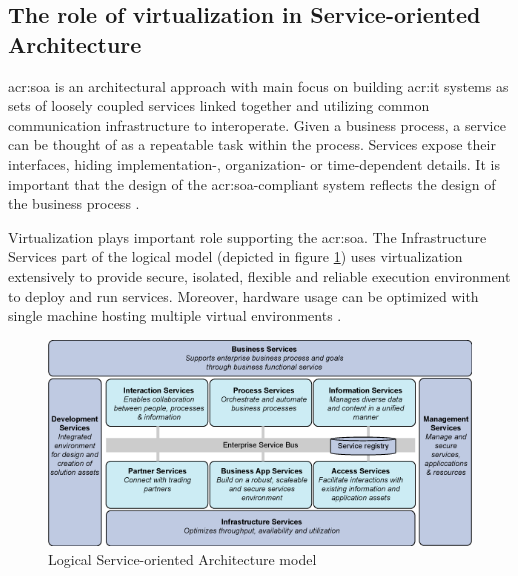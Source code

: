 \documentclass[11pt,openany]{book}
\begin{document}
      \subsection{The role of virtualization in Service-oriented Architecture}

        \gls{acr:soa} is an architectural approach with main focus on building \gls{acr:it} systems as sets of loosely
        coupled services linked together and utilizing common communication infrastructure to interoperate. Given a
        business process, a service can be thought of as a repeatable task within the process. Services expose their
        interfaces, hiding implementation-, organization- or time-dependent details. It is important that the design of
        the \gls{acr:soa}-compliant system reflects the design of the business process \cite{soa-foundation}.

        Virtualization plays important role supporting the \gls{acr:soa}. The Infrastructure Services part of the
        logical model (depicted in figure \ref{fig:ctx:soa-logical}) uses virtualization extensively to provide secure,
        isolated, flexible and reliable execution environment to deploy and run services. Moreover, hardware usage can
        be optimized with single machine hosting multiple virtual environments \cite{soa-foundation}.

        \begin{figure}[h]
          \begin{center}
            \includegraphics[scale=.5]{img/ctx/soa-logical.png}
          \end{center}


          \caption{Logical Service-oriented Architecture model}
          \label{fig:ctx:soa-logical}
        \end{figure}
\end{document}
